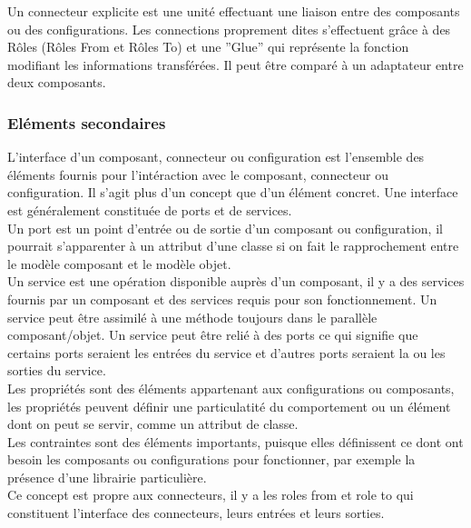 \documentclass[11pt,a4paper]{article}
\begin{document}
Un connecteur explicite est une unité effectuant une liaison entre des
composants ou des configurations. Les connections proprement dites s'effectuent
grâce à des Rôles (Rôles From et Rôles To) et une ''Glue'' qui représente la
fonction modifiant les informations transférées. Il peut être comparé à un
adaptateur entre deux composants.\\

\subsubsection{Eléments secondaires}

L'interface d'un composant, connecteur ou configuration est l'ensemble des
éléments fournis pour l'intéraction avec le composant, connecteur ou
configuration. Il s'agit plus d'un concept que d'un élément concret. Une
interface est généralement constituée de ports et de services.\\

Un port est un point d'entrée ou de sortie d'un composant ou configuration, il
pourrait s'apparenter à un attribut d'une classe si on fait le rapprochement
entre le modèle composant et le modèle objet.\\

Un service est une opération disponible auprès d'un composant, il y a des
services fournis par un composant et des services requis pour son fonctionnement.
Un service peut être assimilé à une méthode toujours dans le parallèle
composant/objet. Un service peut être relié à des ports ce qui signifie que
certains ports seraient les entrées du service et d'autres ports seraient la ou
les sorties du service.\\

Les propriétés sont des éléments appartenant aux configurations ou composants,
les propriétés peuvent définir une particulatité du comportement ou un élément
dont on peut se servir, comme un attribut de classe.\\

Les contraintes sont des éléments importants, puisque elles définissent ce dont
ont besoin les composants ou configurations pour fonctionner,  par exemple la
présence d'une librairie particulière.\\

Ce concept est propre aux connecteurs, il y a les roles from et role to qui
constituent l'interface des connecteurs, leurs entrées et leurs sorties.\\
\end{document}

